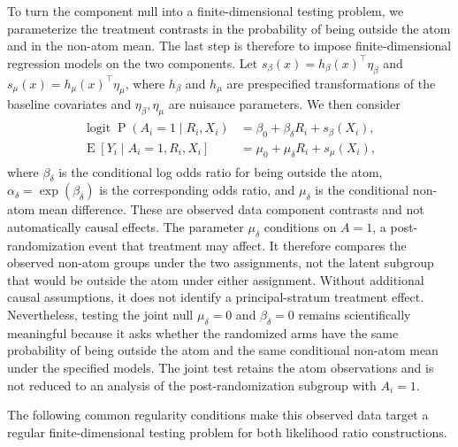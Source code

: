 \documentclass[11pt]{article}
\DeclareMathOperator{\E}{E}
\DeclareMathOperator{\Prob}{P}
\DeclareMathOperator{\logit}{logit}
\begin{document}
To turn the component null into a finite-dimensional testing problem, we
parameterize the treatment contrasts in the probability of being outside the atom and in the
non-atom mean. The last step is therefore to impose finite-dimensional
regression models on the two components. Let
$s_\beta(x)=h_\beta(x)^\top\eta_\beta$ and
$s_\mu(x)=h_\mu(x)^\top\eta_\mu$, where $h_\beta$ and $h_\mu$ are prespecified
transformations of the baseline covariates and $\eta_\beta,\eta_\mu$ are
nuisance parameters. We then consider
\begin{align}
\begin{aligned}
  \logit \Prob(A_i = 1 \mid R_i, X_i)
  &= \beta_0 + \beta_\delta R_i + s_\beta(X_i),\\
  \E[Y_i \mid A_i = 1, R_i, X_i]
  &= \mu_0 + \mu_\delta R_i + s_\mu(X_i),
\end{aligned}
\label{eq:glm}
\end{align}
where $\beta_\delta$ is the conditional log odds ratio for being outside the atom,
$\alpha_\delta=\exp(\beta_\delta)$ is the corresponding odds ratio,
and $\mu_\delta$ is the conditional non-atom mean difference. These are
observed data component contrasts and not automatically causal effects. The
parameter $\mu_\delta$ conditions on $A=1$, a post-randomization event that
treatment may affect. It therefore compares the observed non-atom groups under
the two assignments, not the latent subgroup that would be outside the atom
under either assignment. Without additional causal assumptions, it does not
identify a principal-stratum treatment effect. Nevertheless, testing the joint
null $\mu_\delta=0$ and $\beta_\delta=0$ remains scientifically meaningful because it asks whether the randomized arms have the same probability of being outside the atom and the same conditional non-atom mean under the specified models. The joint test retains the atom observations and is not reduced to an analysis of the post-randomization subgroup with $A_i=1$.


The following common regularity conditions make this observed data target a regular finite-dimensional testing problem for both likelihood ratio constructions.
\end{document}
